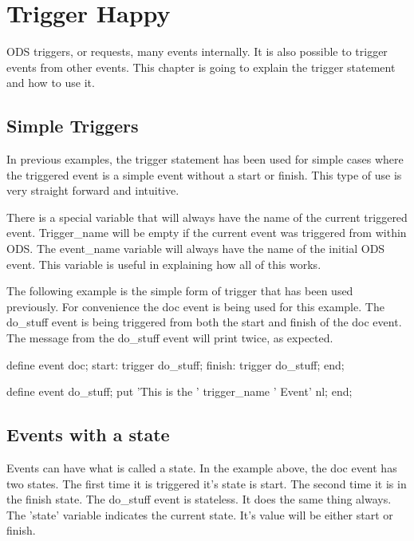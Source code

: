 \chapter{Trigger Happy}
ODS triggers, or requests, many events internally.  
It is also possible to trigger
events from other events. This chapter is going to
explain the trigger statement and how to use it.  

\section{Simple Triggers}
In previous examples, the trigger statement has been used for simple 
cases where the triggered
event is a simple event without a start or finish.  This type of use
is very straight forward and intuitive.

There is a special variable that will always have the name of the 
current triggered event.  Trigger\_name will be empty if the current
event was triggered from within ODS.  The event\_name variable will
always have the name of the initial ODS event.  This variable is useful
in explaining how all of this works.

The following example is the simple form of trigger that has been
used previously.  For convenience the doc event is being used for this
example.  The do\_stuff event is being triggered from both the start
and finish of the doc event.  The message from the do\_stuff event 
will print twice, as expected.

\begin{sfvcode}
   define event doc; 
      start:
          trigger do_stuff;
      finish:
          trigger do_stuff;
   end;

   define event do_stuff;
        put 'This is the ' trigger_name ' Event' nl;
   end;

\end{sfvcode}


\section{Events with a state}
Events can have what is called a state.  In the example above,
the doc event has two states.  The first time it is triggered
it's state is start.  The second time it is in the finish state.
The do\_stuff event is stateless.  It does the same thing always.
The 'state' variable indicates the current state.  It's value
will be either start or finish.  

